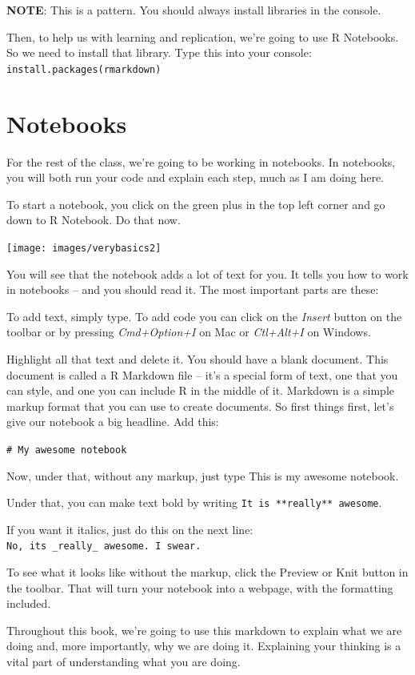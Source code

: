 \documentclass[
]{book}
\begin{document}
\textbf{NOTE}: This is a pattern. You should always install libraries in the console.

Then, to help us with learning and replication, we're going to use R Notebooks. So we need to install that library. Type this into your console: \texttt{install.packages(\textquotesingle{}rmarkdown\textquotesingle{})}

\hypertarget{notebooks}{%
\section{Notebooks}\label{notebooks}}

For the rest of the class, we're going to be working in notebooks. In notebooks, you will both run your code and explain each step, much as I am doing here.

To start a notebook, you click on the green plus in the top left corner and go down to R Notebook. Do that now.

\texttt{[image: images/verybasics2]}

You will see that the notebook adds a lot of text for you. It tells you how to work in notebooks -- and you should read it. The most important parts are these:

To add text, simply type. To add code you can click on the \emph{Insert} button on the toolbar or by pressing \emph{Cmd+Option+I} on Mac or \emph{Ctl+Alt+I} on Windows.

Highlight all that text and delete it. You should have a blank document. This document is called a R Markdown file -- it's a special form of text, one that you can style, and one you can include R in the middle of it. Markdown is a simple markup format that you can use to create documents. So first things first, let's give our notebook a big headline. Add this:

\texttt{\#\ My\ awesome\ notebook}

Now, under that, without any markup, just type This is my awesome notebook.

Under that, you can make text bold by writing \texttt{It\ is\ **really**\ awesome}.

If you want it italics, just do this on the next line: \texttt{No,\ it\textquotesingle{}s\ \_really\_\ awesome.\ I\ swear.}

To see what it looks like without the markup, click the Preview or Knit button in the toolbar. That will turn your notebook into a webpage, with the formatting included.

Throughout this book, we're going to use this markdown to explain what we are doing and, more importantly, why we are doing it. Explaining your thinking is a vital part of understanding what you are doing.
\end{document}

